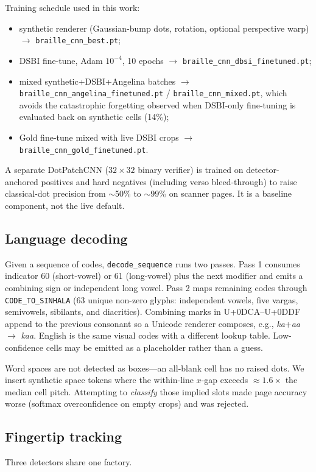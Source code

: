 \documentclass[conference]{IEEEtran}
\begin{document}
Training schedule used in this work:
\begin{itemize}
\item synthetic renderer (Gaussian-bump dots, rotation, optional
perspective warp) $\rightarrow$ \texttt{braille\_cnn\_best.pt};
\item DSBI fine-tune, Adam $10^{-4}$, 10 epochs $\rightarrow$
\texttt{braille\_cnn\_dbsi\_finetuned.pt};
\item mixed synthetic+DSBI+Angelina batches $\rightarrow$
\texttt{braille\_cnn\_angelina\_finetuned.pt} /
\texttt{braille\_cnn\_mixed.pt}, which avoids the catastrophic
forgetting observed when DSBI-only fine-tuning is evaluated back on
synthetic cells (14\%);
\item Gold fine-tune mixed with live DSBI crops $\rightarrow$
\texttt{braille\_cnn\_gold\_finetuned.pt}.
\end{itemize}

A separate DotPatchCNN ($32\times 32$ binary verifier) is trained on
detector-anchored positives and hard negatives (including verso
bleed-through) to raise classical-dot precision from $\sim$50\% to
$\sim$99\% on scanner pages. It is a baseline component, not the live
default.

\subsection{Language decoding}
\label{sec:decode}
Given a sequence of codes, \texttt{decode\_sequence} runs two passes.
Pass 1 consumes indicator 60 (short-vowel) or 61 (long-vowel) plus the
next modifier and emits a combining sign or independent long vowel.
Pass 2 maps remaining codes through \texttt{CODE\_TO\_SINHALA} (63 unique
non-zero glyphs: independent vowels, five vargas, semivowels, sibilants,
and diacritics). Combining marks in U+0DCA--U+0DDF append to the previous
consonant so a Unicode renderer composes, e.g., \textit{ka}+\textit{aa}
$\rightarrow$ \textit{kaa}. English is the same visual codes with a
different lookup table. Low-confidence cells may be emitted as a
placeholder rather than a guess.

Word spaces are not detected as boxes---an all-blank cell has no raised
dots. We insert synthetic space tokens where the within-line $x$-gap
exceeds $\approx 1.6\times$ the median cell pitch. Attempting to
\textit{classify} those implied slots made page accuracy worse
(softmax overconfidence on empty crops) and was rejected.

\subsection{Fingertip tracking}
\label{sec:tip}
Three detectors share one factory.
\end{document}
